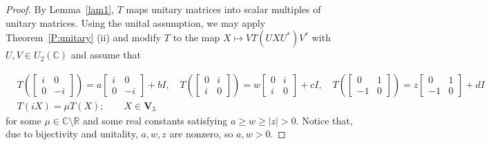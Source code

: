 \documentclass[11pt]{article}
\numberwithin{equation}{section}
\def\IC{{\mathbb C}}
\def\IR{{\mathbb R}}
\def\bV{{\mathbf V}}
\def\bV{{\mathbf V}}
\begin{document}
\begin{proof}
    By Lemma~\ref{lam1}, $T$ maps unitary matrices into scalar multiples of unitary matrices.
Using the unital assumption, we may apply Theorem~\ref{P:unitary} (ii)
 and modify $T$ to the map $X \mapsto VT(UXU^*)V^*$ with $U, V \in U_2(\IC)$ and assume that

\begin{equation}\label{eq:AB*-on-2-by-2anew}
\begin{aligned}
  &T \left( \left[\begin{smallmatrix} i & 0 \\ 0 & -i \end{smallmatrix}\right] \right) = a \left[\begin{smallmatrix} i & 0 \\ 0 & -i \end{smallmatrix}\right] +bI,\quad T \left( \left[\begin{smallmatrix} 0 & i \\ i & 0 \end{smallmatrix}\right] \right) = w\left[\begin{smallmatrix} 0 & i \\ i & 0 \end{smallmatrix}\right] +cI, \quad T \left( \left[\begin{smallmatrix} 0 & 1 \\ -1 & 0 \end{smallmatrix}\right] \right) = z\left[\begin{smallmatrix} 0 & 1 \\ -1 & 0 \end{smallmatrix}\right] + dI\\
  &T(iX)=\mu T(X);\qquad X\in\bV_3
\end{aligned}
\end{equation}
for some $\mu\in\IC\setminus\IR$ and some real constants satisfying $a\ge w\ge|z| > 0$. Notice that, due to bijectivity and unitality, $a, w, z$  are nonzero, so $a,w>0$.



\end{proof}
\end{document}
